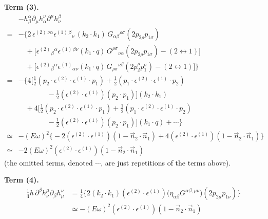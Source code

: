 \documentclass[12pt,a4paper,oneside]{article}
\numberwithin{equation}{section}   %
\begin{document}
\bigskip
\noindent\textbf{Term (3).}
\begin{align*}
&-h_\beta^\alpha\partial_\mu h_\alpha^\nu\partial^\mu h_\nu^\beta\\
={}& -\Big\{2\,\epsilon^{(2)\,\nu\alpha}\epsilon^{(1)\,\beta}{}_{\nu}\,(k_2\!\cdot\!k_1)\,
G_{\alpha\beta}{}^{\rho\sigma}(2p_{2\rho}p_{1\sigma}) \\
&\quad +\big[\epsilon^{(2)}{}_{\beta}{}^{\alpha}\epsilon^{(1)\,\beta\nu}(k_1\!\cdot\! q)\,
G^{\rho\sigma}{}_{\nu\alpha}(2p_{2\rho}p_{1\sigma})-(2\leftrightarrow1)\big] \\
&\quad +\big[\epsilon^{(2)}{}_{\beta}{}^{\alpha}\epsilon^{(1)}{}_{\alpha\nu}(k_1\!\cdot\! q)\,
G_{\rho\sigma}{}^{\nu\beta}(2p_2^\rho p_1^\sigma)-(2\leftrightarrow1)\big]\Big\} \\[4pt]
={}& -\Big\{4\Big[\tfrac12(p_2\!\cdot\!\epsilon^{(2)}\!\cdot\!\epsilon^{(1)}\!\cdot\! p_1)
+\tfrac12(p_1\!\cdot\!\epsilon^{(2)}\!\cdot\!\epsilon^{(1)}\!\cdot\! p_2)\\
&\qquad\qquad-\tfrac12(\epsilon^{(2)}\!\cdot\epsilon^{(1)})(p_2\!\cdot\!p_1)\Big](k_2\!\cdot\!k_1) \\
&\quad +4\Big[\tfrac12(p_2\!\cdot\!\epsilon^{(2)}\!\cdot\!\epsilon^{(1)}\!\cdot\! p_1)
+\tfrac12(p_1\!\cdot\!\epsilon^{(2)}\!\cdot\!\epsilon^{(1)}\!\cdot\! p_2)\\
&\qquad\qquad-\tfrac12(\epsilon^{(2)}\!\cdot\epsilon^{(1)})(p_2\!\cdot\!p_1)\Big](k_1\!\cdot\! q)+\cdots\Big\} \\[4pt]
\simeq{}& -(E\omega)^2\Big\{-2(\epsilon^{(2)}\!\cdot\epsilon^{(1)})(1-\vec n_2\!\cdot\!\vec n_1)
+4(\epsilon^{(2)}\!\cdot\epsilon^{(1)})(1-\vec n_2\!\cdot\!\vec n_1)\Big\} \\[4pt]
\simeq{}& -2(E\omega)^2(\epsilon^{(2)}\!\cdot\epsilon^{(1)})(1-\vec n_2\!\cdot\!\vec n_1)
\end{align*}
(the omitted terms, denoted $\cdots$, are just repetitions of the terms above).
 
\bigskip
\noindent\textbf{Term (4).}
\begin{align*}
\tfrac14 h\,\partial^\beta h_\nu^\mu \partial_\beta h_\mu^\nu
&= \tfrac14\Big\{2(k_2\!\cdot\!k_1)(\epsilon^{(2)}\!\cdot\epsilon^{(1)})
\bigl(\eta_{\alpha\beta}G^{\alpha\beta,\mu\nu}\bigr)(2p_{2\mu}p_{1\nu})\Big\} \\
&\simeq -(E\omega)^2(\epsilon^{(2)}\!\cdot\epsilon^{(1)})(1-\vec n_2\!\cdot\!\vec n_1)
\end{align*}
 
\end{document}
